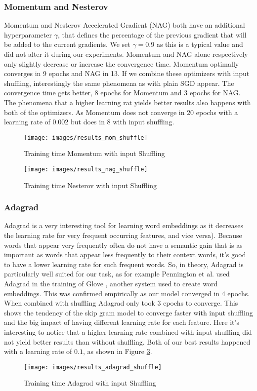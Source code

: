 \subsubsection{Momentum and Nesterov}
Momentum and  Nesterov Accelerated Gradient (NAG) \cite{nag} both have an additional hyperparameter $\gamma$, that defines the percentage of the previous gradient that will be added to the current gradients. We set $\gamma = 0.9$ as this is a typical value and did not alter it during our experiments. Momentum and NAG alone respectively only slightly decrease or increase the convergence time. Momentum optimally converges in 9 epochs and NAG in 13. If we combine these optimizers with input shuffling, interestingly the same phenomena as with plain SGD appear. The convergence time gets better, 8 epochs for Momentum and 3 epochs for NAG. The phenomena that a higher learning rat yields better results also happens with both of the optimizers. As Momentum does not converge in 20 epochs with a learning rate of 0.002 but does in 8 with input shuffling.
\begin{figure}[h]
\centering

\texttt{[image: images/results\_mom\_shuffle]}
\caption{Training time Momentum with input Shuffling}
\label{fig:results_mom}
\end{figure}

\begin{figure}[h]
\centering
\texttt{[image: images/results\_nag\_shuffle]}
\caption{Training time Nesterov with input Shuffling}
\label{fig:results_nag}
\end{figure}
\subsubsection{Adagrad}
Adagrad \cite{adagrad} is a very interesting tool for learning word embeddings as it decreases the learning rate for very frequent occurring features, and vice versa). Because words that appear very frequently often do not have a semantic gain that is as important as words that appear less frequently to their context words, it's good to have a lower learning rate for such frequent words. So, in theory, Adagrad is particularly well suited for our task, as for example Pennington et al. used Adagrad in the training of Glove \cite{glove}, another system used to create word embeddings.  This was confirmed empirically as our model converged in 4 epochs. When combined with shuffling Adagrad only took 3 epochs to converge. This shows the tendency of the skip gram model to converge faster with input shuffling and the big impact of having different learning rate for each feature.
Here it's interesting to notice that a higher learning rate combined with input shuffling did not yield better results than without shuffling. Both of our best results happened with a learning rate of $0.1$, as shown in Figure \ref{fig:results_adagrad_shuffle}.
\begin{figure}[h]
\centering
\texttt{[image: images/results\_adagrad\_shuffle]}
\caption{Training time Adagrad with input Shuffling}
\label{fig:results_adagrad_shuffle}
\end{figure}
